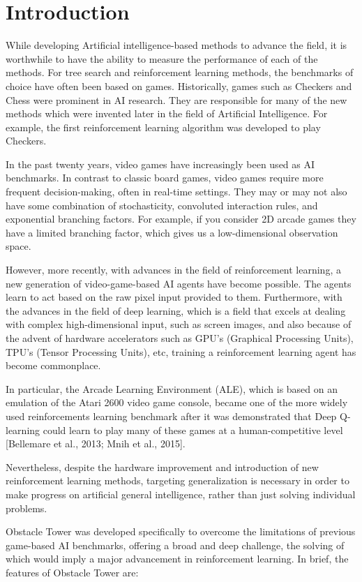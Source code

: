\documentclass[conference]{IEEEtran}
\begin{document}
\section{Introduction}
While developing Artificial intelligence-based methods to advance the field, it is worthwhile to have the ability to measure the performance of each of the methods. For tree search and reinforcement learning methods, the benchmarks of choice have often been based on games. Historically, games such as Checkers and Chess were prominent in AI research. They are responsible for many of the new methods which were invented later in the field of Artificial Intelligence. For example, the first reinforcement learning algorithm was developed to play Checkers.

In the past twenty years, video games have increasingly been used as AI benchmarks. In contrast to classic board games, video games require more frequent decision-making, often in real-time settings. They may or may not also have some combination of stochasticity, convoluted interaction rules, and exponential branching factors. For example, if you consider 2D arcade games they have a limited branching factor, which gives us a low-dimensional observation space. 

However, more recently, with advances in the field of reinforcement learning, a new generation of video-game-based AI agents have become possible. The agents learn to act based on the raw pixel input provided to them. Furthermore, with the advances in the field of deep learning, which is a field that excels at dealing with complex high-dimensional input, such as screen images, and also because of the advent of hardware accelerators such as GPU's (Graphical Processing Units), TPU's (Tensor Processing Units), etc, training a reinforcement learning agent has become commonplace.

In particular, the Arcade Learning Environment (ALE), which is based on an emulation of the Atari 2600 video game console, became one of the more widely used reinforcements learning benchmark after it was demonstrated that Deep Q-learning could learn to play many of these games at a human-competitive level [Bellemare et al., 2013; Mnih et al., 2015].

Nevertheless, despite the hardware improvement and introduction of new reinforcement learning methods, targeting generalization is
necessary in order to make progress on artificial general intelligence, rather than just solving individual problems.

Obstacle Tower was developed specifically to overcome the limitations of previous game-based AI benchmarks, offering a broad and deep challenge, the solving of which would imply a major advancement in reinforcement learning. In brief, the features of Obstacle Tower are:
\end{document}
